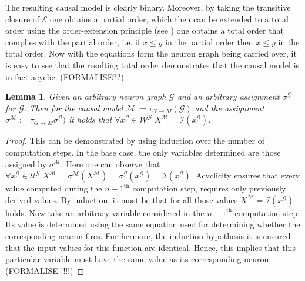 \documentclass[11pt,a4paper]{book}
\newtheorem{lemma}[theorem]{Lemma}
\theoremstyle{definition}
\theoremstyle{definition}
\theoremstyle{definition}
\theoremstyle{remark}
\newcommand{\interi}{\mathcal{I}}
\newcommand{\ngraph}{\mathcal{G}}
\newcommand{\cmodel}{\mathcal{M}}
\newcommand{\cvars}{\mathcal{W}}
\newcommand{\cexvars}{\mathcal{U}}
\newcommand{\crel}{\mathcal{E}}
\begin{document}
The resulting causal model is clearly binary. Moreover, by taking the transitive closure of $\crel$ one obtains a partial order, which then can be extended to a total order using the order-extension principle (see \cite{felgner1999independence}) one obtains a total order that complies with the partial order, i.e. if $x \leq y$ in the partial order then $x \leq y$ in the total order. 
Now with the equations form the neuron graph being carried over, it is easy to see that the resulting total order demonstrates that the causal model is in fact acyclic. (FORMALISE??)


\begin{lemma}
Given an arbitrary neuron graph $\ngraph$ and an arbitrary assignment $\sigma^{\ngraph}$ for $\ngraph$. Then for the causal model $\cmodel:=\tau_{G\to M}(\ngraph)$ and the assignment $\sigma^{\cmodel}:= \tau_{G\to M}\sigma^{\ngraph})$ it holds that
$\forall x^{\ngraph} \in \cvars^{\ngraph} \; X^{\cmodel} = \interi(x^{\ngraph})$.
\end{lemma}
\begin{proof}
This can be demonstrated by using induction over the number of computation steps.
In the base case, the only variables determined are those assigned by $\sigma^{\cmodel}$. Here one can observe that
$\forall x^{\ngraph} \in \cexvars^{\ngraph} \; X^{\cmodel} =  \sigma^{\cmodel}(X^{\cmodel})  =  \sigma^{\ngraph}(x^{\ngraph})= \interi(x^{\ngraph})$.
Acyclicity ensures that every value computed during the $n+1^{\text{th}}$ computation step, requires only previously derived values. By induction, it must be that for all those values
$ X^{\cmodel} = \interi(x^{\ngraph})$ holds. Now take an arbitrary variable considered in the $n+1^{\text{th}}$ computation step. Its value is determined using the same equation used for determining whether the corresponding neuron fires. Furthermore, the induction hypothesis it is ensured that the input values for this function are identical. Hence, this implies that this particular variable must have the same value as its corresponding neuron. (FORMALISE !!!!)
\end{proof}
\end{document}
